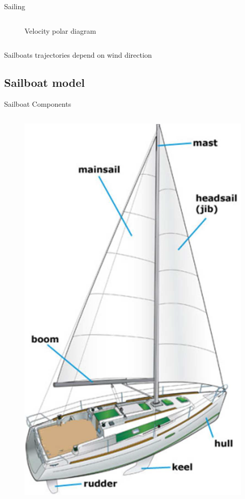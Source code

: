 \documentclass[10pt,xcolor={table,dvipsnames},t]{beamer}
\begin{document}
\begin{frame}{Sailing}
\begin{columns}
\begin{figure}
    \caption{Velocity polar diagram \cite{Alves2010}}
    \label{fig:alves_velocity}
\end{figure}
\end{columns}
\centerline{Sailboats trajectories depend on wind direction}
\end{frame}

\subsection{Sailboat model}

\begin{frame}{Sailboat Components}
\begin{columns}
    \begin{figure}
        \centering
        \includegraphics[height = 0.6\textheight, keepaspectratio]{documents/figures/alves_sailboat.png}

\end{figure}
\end{columns}
\end{frame}
\end{document}
